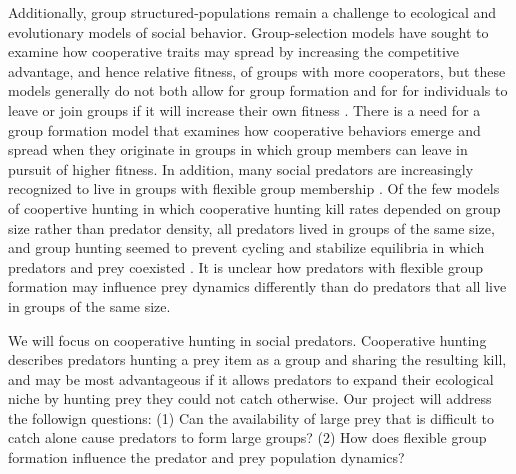 Additionally, group structured-populations remain a challenge to ecological and evolutionary models of social behavior. Group-selection models have sought to examine how cooperative traits may spread by increasing the competitive advantage, and hence relative fitness, of groups with more cooperators, but these models generally do not both allow for group formation and for for individuals to leave or join groups if it will increase their own fitness \cite{traulsen_evolution_2006, simon_towards_2013}. There is a need for a group formation model that examines how cooperative behaviors emerge and spread when they originate in groups in which group members can leave in pursuit of higher fitness. In addition, many social predators are increasingly recognized to live in groups with flexible group membership \cite{smith_social_2008} . Of the few models of coopertive hunting in which cooperative hunting kill rates depended on group size rather than predator density, all predators lived in groups of the same size, and group hunting seemed to prevent cycling and stabilize equilibria in which predators and prey coexisted \cite{fryxell_group_2007}. It is unclear how predators with flexible group formation may influence prey dynamics differently than do predators that all live in groups of the same size.

We will focus on cooperative hunting in social predators. Cooperative hunting describes predators hunting a prey item as a group and sharing the resulting kill, and may be most advantageous if it allows predators to expand their ecological niche by hunting prey they could not catch otherwise. Our project will address the followign questions: (1) Can the availability of large prey that is difficult to catch alone cause predators to form large groups? (2) How does flexible group formation influence the predator and prey population dynamics?

